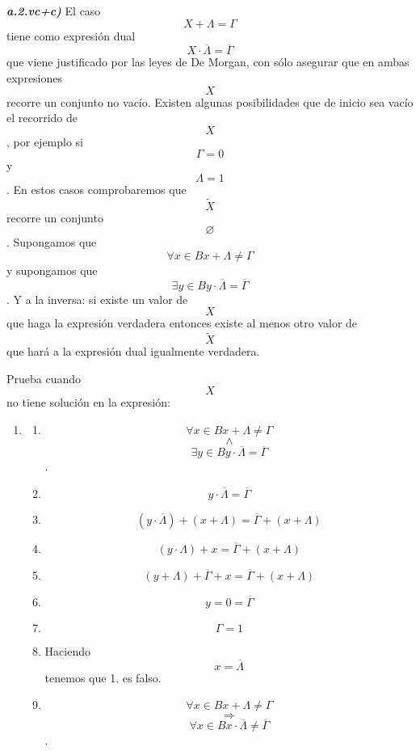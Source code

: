 \begin{enumerate}
\begin{enumerate}
\begin{enumerate}
\begin{enumerate}
\begin{enumerate}
          \emph{\textbf{a.2.vc+c)}} El caso \[{X + \Lambda} = \Gamma\]
          tiene como expresión dual
          \[{X \cdot \overline{\Lambda}} = \overline{\Gamma}\] que viene
          justificado por las leyes de De Morgan, con sólo asegurar que
          en am\-bas expresiones \[X\]recorre un conjunto no vacío.
          Existen algunas posibili\-dades que de inicio sea vacío el
          recorrido de \[X\], por ejemplo si \[\Gamma = 0\] y
          \[\Lambda = 1\]. En estos casos comprobaremos que
          \[\widetilde{X}\] recorre un conjunto \[\varnothing\].
          Supongamos que
          \[\forall{x \in B}{{x + \Lambda} \neq \Gamma}\]y supongamos
          que
          \[\exists{y \in B}{{y \cdot \overline{\Lambda}} = \overline{\Gamma}}\].
          Y a la inversa: si existe un valor de \[X\] que haga la
          ex\-presión verdadera entonces existe al menos otro valor de
          \[\widetilde{X}\] que hará a la expresión dual igualmente
          verdadera.

          Prueba cuando \[X\] no tiene solución en la expresión:

          \begin{enumerate}
          \def\labelenumvi{\arabic{enumvi}.}
          \tightlist
          \item
            \begin{enumerate}
            \def\labelenumvii{\arabic{enumvii}.}
            \tightlist
            \item
              \[\forall{x \in B}{{x + \Lambda} \neq \Gamma}\]\[\land\]\[\exists{y \in B}{{y \cdot \overline{\Lambda}} = \overline{\Gamma}}\].
            \item
              \[{y \cdot \overline{\Lambda}} = \overline{\Gamma}\]
            \item
              \[{\left( {y \cdot \overline{\Lambda}} \right) + \left( {x + \Lambda} \right)} = {\overline{\Gamma} + \left( {x + \Lambda} \right)}\]
            \item
              \[{\left( {y \cdot \Lambda} \right) + x} = {\overline{\Gamma} + \left( {x + \Lambda} \right)}\]
            \item
              \[{{\left( {y + \Lambda} \right) + \overline{\Gamma}} + x} = {\overline{\Gamma} + \left( {x + \Lambda} \right)}\]
            \item
              \[{y = 0} = \overline{\Gamma}\]
            \item
              \[\Gamma = 1\]
            \item
              Haciendo \[x = \overline{\Lambda}\] tenemos que 1. es
              falso.
            \item
              \[\forall{x \in B}{{x + \Lambda} \neq \Gamma}\]\[\Rightarrow\]\[\forall{x \in B}{{x \cdot \overline{\Lambda}} \neq \overline{\Gamma}}\].
            \end{enumerate}
          \end{enumerate}


\end{enumerate}
\end{enumerate}
\end{enumerate}
\end{enumerate}
\end{enumerate}
